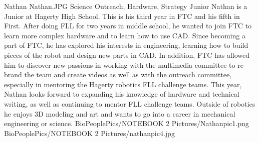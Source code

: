 \insertbio
{Nathan}
{Nathan.JPG}
{Science}
{Outreach, Hardware, Strategy}
{Junior}
{
Nathan is a Junior at Hagerty High School. This is his third year in FTC and his fifth in First. After doing FLL for two years in middle school, he wanted to join FTC to learn more complex hardware and to learn how to use CAD. Since becoming a part of FTC, he has explored his interests in engineering, learning how to build pieces of the robot and design new parts in CAD. In addition, FTC has allowed him to discover new passions in working with the multimedia committee to re-brand the team and create videos as well as with the outreach committee, especially in mentoring the Hagerty robotics FLL challenge teams. This year, Nathan looks forward to expanding his knowledge of hardware and technical writing, as well as continuing to mentor FLL challenge teams. Outside of robotics he enjoys 3D modeling and art and wants to go into a career in mechanical engineering or science.
}
{BioPeoplePics/NOTEBOOK 2 Pictures/Nathanpic1.png}
{BioPeoplePics/NOTEBOOK 2 Pictures/nathanpic4.jpg}
